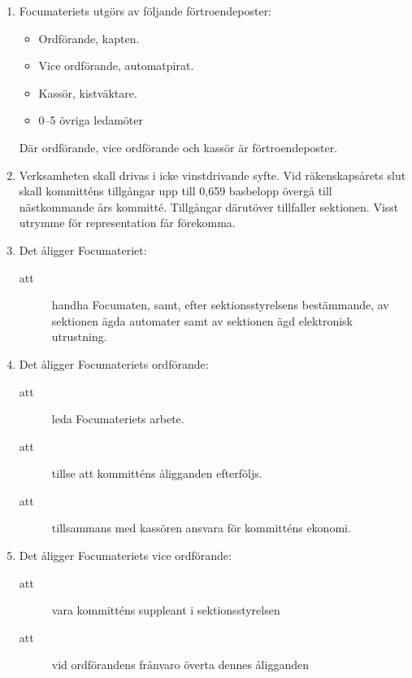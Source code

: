 \documentclass[11pt,a4paper]{article}
\begin{document}
\begin{enumerate}[\thesubsection .1]

  \item Focumateriets utgörs av följande förtroendeposter:
  
    \begin{itemize}
      \item Ordförande, kapten.
      \item Vice ordförande, automatpirat.
      \item Kassör, kistväktare.
      \item 0--5 övriga ledamöter
    \end{itemize}
    Där ordförande, vice ordförande och kassör är förtroendeposter.



  \item Verksamheten skall drivas i icke vinstdrivande syfte. Vid räkenskapsårets slut skall kommitténs tillgångar upp till 0,659 basbelopp övergå till nästkommande års kommitté. Tillgångar därutöver tillfaller sektionen. Visst utrymme för representation får förekomma.

  \item Det åligger Focumateriet:
    \begin{description}
      \item[att] handha Focumaten, samt, efter sektionsstyrelsens bestämmande,
      av sektionen ägda automater samt av sektionen ägd elektronisk
      utrustning.
   
    \end{description}

  \item Det åligger Focumateriets ordförande:
    \begin{description}
      \item[att] leda Focumateriets arbete.
      \item[att] tillse att kommitténs åligganden efterföljs.
      \item[att] tillsammans med kassören ansvara för kommitténs ekonomi.
    \end{description}

 \item Det åligger Focumateriets vice ordförande:
    \begin{description}
      \item[att] vara kommitténs suppleant i sektionsstyrelsen
      
      \item[att] vid ordförandens frånvaro överta dennes åligganden
      

\end{description}
\end{enumerate}
\end{document}
